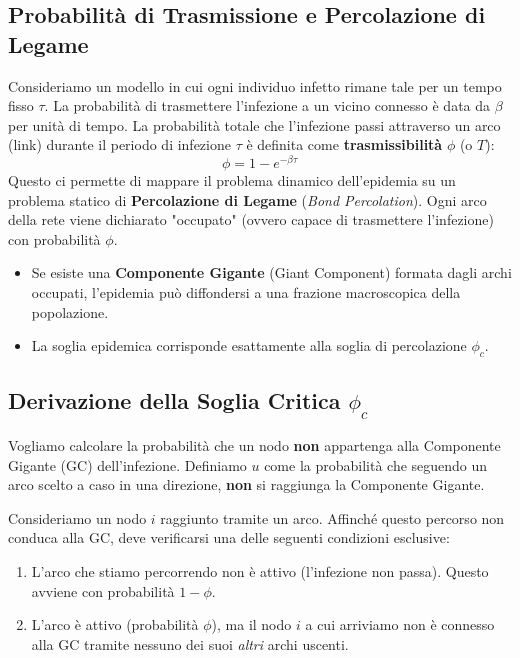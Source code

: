 \subsection{Probabilità di Trasmissione e Percolazione di Legame}
Consideriamo un modello in cui ogni individuo infetto rimane tale per un tempo fisso $\tau$. La probabilità di trasmettere l'infezione a un vicino connesso è data da $\beta$ per unità di tempo.
La probabilità totale che l'infezione passi attraverso un arco (link) durante il periodo di infezione $\tau$ è definita come \textbf{trasmissibilità} $\phi$ (o $T$):
\begin{equation}
    \phi = 1 - e^{-\beta \tau}
\end{equation}
Questo ci permette di mappare il problema dinamico dell'epidemia su un problema statico di \textbf{Percolazione di Legame} (\textit{Bond Percolation}).
Ogni arco della rete viene dichiarato "occupato" (ovvero capace di trasmettere l'infezione) con probabilità $\phi$.
\begin{itemize}
    \item Se esiste una \textbf{Componente Gigante} (Giant Component) formata dagli archi occupati, l'epidemia può diffondersi a una frazione macroscopica della popolazione.
    \item La soglia epidemica corrisponde esattamente alla soglia di percolazione $\phi_c$.
\end{itemize}


\subsection{Derivazione della Soglia Critica $\phi_c$}
Vogliamo calcolare la probabilità che un nodo \textbf{non} appartenga alla Componente Gigante (GC) dell'infezione.
Definiamo $u$ come la probabilità che seguendo un arco scelto a caso in una direzione, \textbf{non}  si raggiunga la Componente Gigante. 

Consideriamo un nodo $i$ raggiunto tramite un arco. Affinché questo percorso non conduca alla GC, deve verificarsi una delle seguenti condizioni esclusive:
\begin{enumerate}
    \item L'arco che stiamo percorrendo non è attivo (l'infezione non passa). Questo avviene con probabilità $1 - \phi$.
    \item L'arco è attivo (probabilità $\phi$), ma il nodo $i$ a cui arriviamo non è connesso alla GC tramite nessuno dei suoi \textit{altri} archi uscenti.
\end{enumerate}

